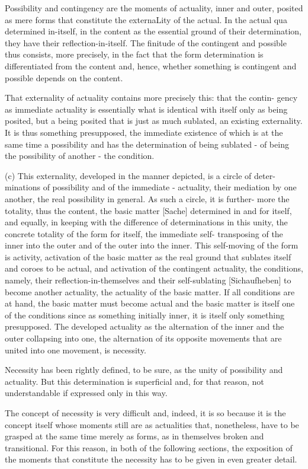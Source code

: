Possibility and contingency are the moments of actuality, inner and outer,
posited as mere forms that constitute the externaLity of the actual. In the
actual qua determined in-itself, in the content as the essential ground
of their determination, they have their reflection-in-itself. The finitude
of the contingent and possible thus consists, more precisely, in the fact
that the form determination is differentiated from the content and, hence,
whether something is contingent and possible depends on the content.

That externality of actuality contains more precisely this: that the contin-
gency as immediate actuality is essentially what is identical with itself only as
being posited, but a being posited that is just as much sublated,
 an existing externality.
It is thus something presupposed, the immediate existence of which is
at the same time a possibility and has the determination of being sublated -
of being the possibility of another - the condition.

(c) This externality, developed in the manner depicted, is a circle of deter-
minations of possibility and of the immediate - actuality, their mediation
by one another, the real possibility in general. As such a circle, it is further-
more the totality, thus the content, the basic matter [Sache] determined in
and for itself, and equally, in keeping with the difference of determinations
in this unity, the concrete totality of the form for itself, the immediate self-
transposing of the inner into the outer and of the outer into the inner. This
self-moving of the form is activity, activation of the basic matter as the real
ground that sublates itself and coroes to be actual, and activation of the
contingent actuality, the conditions, namely, their reflection-in-themselves
and their self-sublating [Sichaufheben] to become another actuality, the
actuality of the basic matter. If all conditions are at hand, the basic matter
must become actual and the basic matter is itself one of the conditions since
as something initially inner, it is itself only something presupposed. The
developed actuality as the alternation of the inner and the outer collapsing
into one, the alternation of its opposite movements that are united into
one movement, is necessity.

Necessity has been rightly defined, to be sure,
as the unity of possibility and actuality.
But this determination is superficial and,
for that reason, not understandable if expressed only in this way.

The concept of necessity is very difficult and, indeed, it is so because
it is the concept itself whose moments still are as actualities that,
nonetheless, have to be grasped at the same time merely as forms, as
in themselves broken and transitional. For this reason, in both of the
following sections, the exposition of the moments that constitute
the necessity has to be given in even greater detail.


